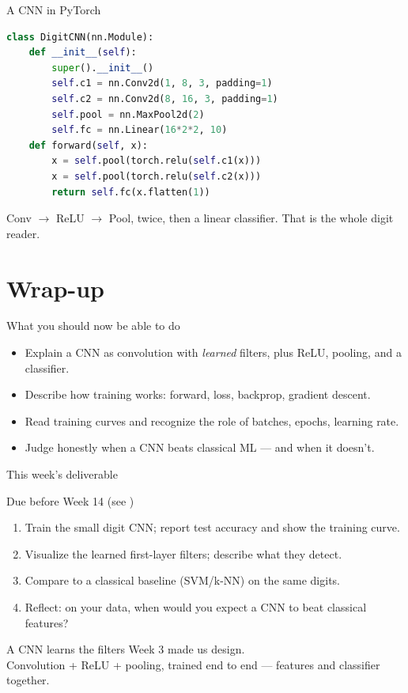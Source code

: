 \documentclass[10pt,aspectratio=169]{beamer}
\begin{document}
\begin{frame}[fragile]{A CNN in PyTorch}
\begin{lstlisting}[language=Python]
class DigitCNN(nn.Module):
    def __init__(self):
        super().__init__()
        self.c1 = nn.Conv2d(1, 8, 3, padding=1)
        self.c2 = nn.Conv2d(8, 16, 3, padding=1)
        self.pool = nn.MaxPool2d(2)
        self.fc = nn.Linear(16*2*2, 10)
    def forward(self, x):
        x = self.pool(torch.relu(self.c1(x)))
        x = self.pool(torch.relu(self.c2(x)))
        return self.fc(x.flatten(1))
\end{lstlisting}
  Conv $\rightarrow$ ReLU $\rightarrow$ Pool, twice, then a linear classifier. That is the whole digit reader.
\end{frame}

\section{Wrap-up}

\begin{frame}{What you should now be able to do}
  \begin{itemize}
    \item Explain a CNN as convolution with \emph{learned} filters, plus ReLU, pooling, and a classifier.
    \item Describe how training works: forward, loss, backprop, gradient descent.
    \item Read training curves and recognize the role of batches, epochs, learning rate.
    \item Judge honestly when a CNN beats classical ML — and when it doesn't.
  \end{itemize}
\end{frame}

\begin{frame}{This week's deliverable}
  \begin{alertblock}{Due before Week 14 (see )}
    \begin{enumerate}
      \item Train the small digit CNN; report test accuracy and show the training curve.
      \item Visualize the learned first-layer filters; describe what they detect.
      \item Compare to a classical baseline (SVM/k-NN) on the same digits.
      \item Reflect: on your data, when would you expect a CNN to beat classical features?
    \end{enumerate}
  \end{alertblock}
\end{frame}

\begin{frame}[standout]
  A CNN learns the filters Week 3 made us design.\\[4pt]
  \normalsize Convolution + ReLU + pooling, trained end to end — features and classifier together.
\end{frame}
\end{document}
